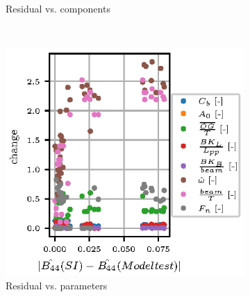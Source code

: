 \begin{figure}[H]
\begin{subfigure}[b]{0.485\textwidth}
        \caption{Residual vs. components}
        \label{fig:component_residual}
    \end{subfigure}
    \newline
    ~ %
    \begin{subfigure}[b]{0.485\textwidth}
        \centering
        \includegraphics[width=\textwidth]{figures/parameter_residual.eps}
        \caption{Residual vs. parameters}
        \label{fig:parameter_residual}
    \end{subfigure}
    ~ %
    \begin{subfigure}[b]{0.485\textwidth}
        \centering

\end{subfigure}
\end{figure}
